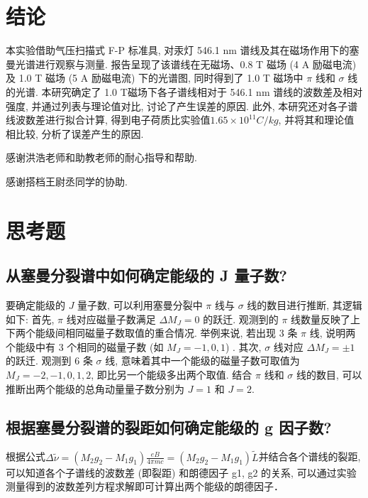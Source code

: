 \documentclass[font=default]{mpltx}
\begin{document}
 
\section{结论}
  本实验借助气压扫描式 F-P 标准具, 
  对汞灯 546.1 nm 谱线及其在磁场作用下的塞曼光谱进行观察与测量.
  报告呈现了该谱线在无磁场、0.8 T 磁场 (4 A 励磁电流) 及 1.0 T 磁场 (5 A 励磁电流) 下的光谱图, 
  同时得到了 1.0 T 磁场中 $\pi$ 线和 $\sigma$ 线的光谱. 
  本研究确定了 1.0 T磁场下各子谱线相对于 546.1 nm 谱线的波数差及相对强度, 
  并通过列表与理论值对比, 讨论了产生误差的原因.
  此外, 本研究还对各子谱线波数差进行拟合计算, 得到电子荷质比实验值$1.65 \times 10^{11} C/kg$, 并将其和理论值相比较, 分析了误差产生的原因.

\begin{acknowledgments}
  感谢洪浩老师和助教老师的耐心指导和帮助.
  \par
  感谢搭档王尉丞同学的协助.
\end{acknowledgments}



\clearpage %
\appendix %
\section{思考题}\label{app:exercise}
\subsection{从塞曼分裂谱中如何确定能级的 J 量子数?}
要确定能级的 $J$ 量子数, 可以利用塞曼分裂中 $\pi$ 线与 $\sigma$ 线的数目进行推断, 其逻辑如下:
首先, $\pi$ 线对应磁量子数满足 $\Delta M_J = 0$ 的跃迁. 
观测到的 $\pi$ 线数量反映了上下两个能级间相同磁量子数取值的重合情况. 
举例来说, 若出现 3 条 $\pi$ 线, 说明两个能级中有 3 个相同的磁量子数 (如 $M_J = -1, 0, 1$) . 
其次, $\sigma$ 线对应 $\Delta M_J = \pm 1$ 的跃迁. 
观测到 6 条 $\sigma$ 线, 意味着其中一个能级的磁量子数可取值为 $M_J = -2, -1, 0, 1, 2$, 即比另一个能级多出两个取值. 
结合 $\pi$ 线和 $\sigma$ 线的数目, 
可以推断出两个能级的总角动量量子数分别为 $J = 1$ 和 $J = 2$. 
\subsection{根据塞曼分裂谱的裂距如何确定能级的 g 因子数?}
根据公式$\Delta \widetilde{\nu} = (M_2 g_2 - M_1 g_1) \frac{eB}{4\pi m c} = (M_2 g_2 - M_1 g_1) \widetilde{L}$并结合各个谱线的裂距, 
可以知道各个子谱线的波数差 (即裂距) 和朗德因子 g1, g2 的关系, 可以通过实验测量得到的波数差列方程求解即可计算出两个能级的朗德因子．
\end{document}
